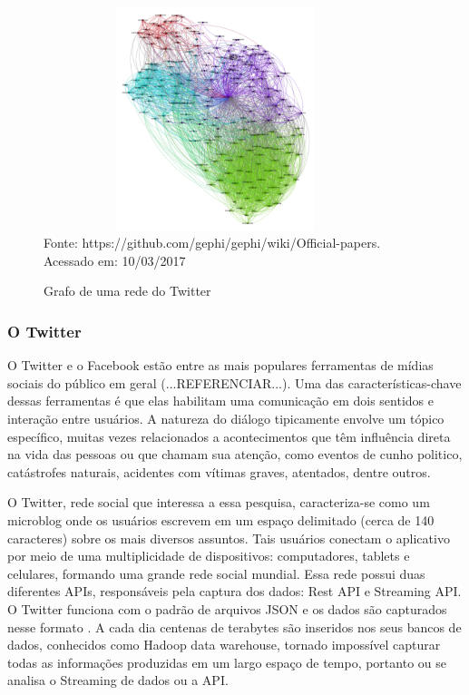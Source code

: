 \begin{figure}[!ht]
	\centering
	\caption{Grafo de uma rede do Twitter}
	\vspace{1mm}
	\includegraphics[width=100mm, height=65mm]{Figuras/BigData/grafoExemplo.png}\\
	\tiny Fonte: https://github.com/gephi/gephi/wiki/Official-papers. Acessado em: 10/03/2017
\end{figure}



\subsubsection{O Twitter}

O Twitter e o Facebook estão entre as mais populares ferramentas de mídias sociais do público em geral (...REFERENCIAR...). Uma das características-chave
dessas ferramentas é que elas habilitam uma comunicação em dois sentidos e interação entre usuários. A natureza do diálogo tipicamente envolve um tópico específico, muitas vezes relacionados a acontecimentos que têm influência direta na vida das pessoas ou que chamam sua atenção, como eventos de cunho politico, catástrofes naturais, acidentes com vítimas graves, atentados, dentre outros.

O Twitter, rede social que interessa a essa pesquisa, caracteriza-se como um microblog onde os usuários escrevem em um espaço delimitado (cerca de 140 caracteres) sobre os mais diversos assuntos. Tais usuários conectam o aplicativo por meio de uma multiplicidade de dispositivos: computadores, tablets e celulares, formando uma grande rede social mundial. Essa rede possui duas diferentes APIs, responsáveis pela captura dos dados: Rest API e Streaming API. O Twitter funciona com o padrão de arquivos JSON e os dados são capturados nesse formato \cite{francca14big}. A cada dia centenas de terabytes são inseridos nos seus bancos de dados, conhecidos como Hadoop data warehouse, tornado impossível capturar todas as informações produzidas em um largo espaço de tempo, portanto ou se analisa o Streaming de dados ou a API.

